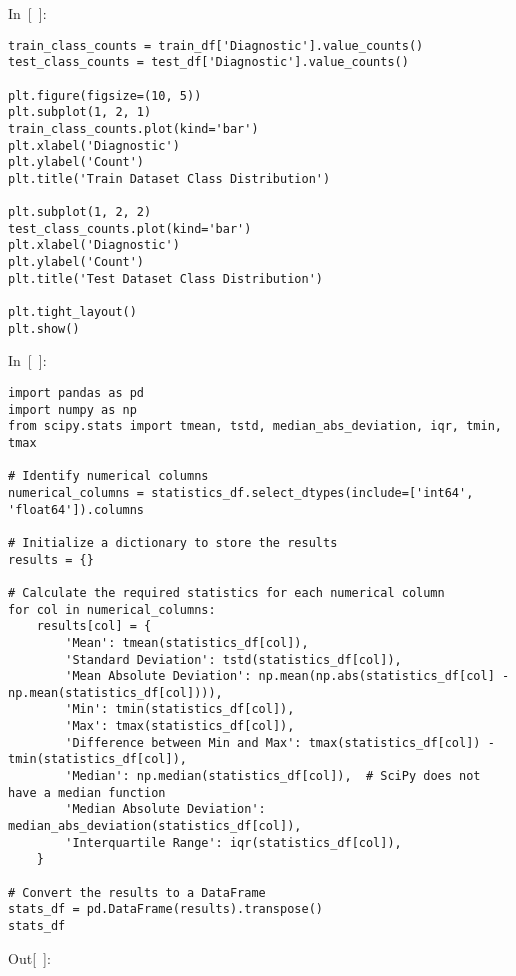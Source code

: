 \documentclass[
  english,
]{article}
\begin{document}
In~{[}~{]}:

\begin{verbatim}
train_class_counts = train_df['Diagnostic'].value_counts()
test_class_counts = test_df['Diagnostic'].value_counts()

plt.figure(figsize=(10, 5))
plt.subplot(1, 2, 1)
train_class_counts.plot(kind='bar')
plt.xlabel('Diagnostic')
plt.ylabel('Count')
plt.title('Train Dataset Class Distribution')

plt.subplot(1, 2, 2)
test_class_counts.plot(kind='bar')
plt.xlabel('Diagnostic')
plt.ylabel('Count')
plt.title('Test Dataset Class Distribution')

plt.tight_layout()
plt.show()
\end{verbatim}

In~{[}~{]}:

\begin{verbatim}
import pandas as pd
import numpy as np
from scipy.stats import tmean, tstd, median_abs_deviation, iqr, tmin, tmax

# Identify numerical columns
numerical_columns = statistics_df.select_dtypes(include=['int64', 'float64']).columns

# Initialize a dictionary to store the results
results = {}

# Calculate the required statistics for each numerical column
for col in numerical_columns:
    results[col] = {
        'Mean': tmean(statistics_df[col]),
        'Standard Deviation': tstd(statistics_df[col]),
        'Mean Absolute Deviation': np.mean(np.abs(statistics_df[col] - np.mean(statistics_df[col]))),
        'Min': tmin(statistics_df[col]),
        'Max': tmax(statistics_df[col]),
        'Difference between Min and Max': tmax(statistics_df[col]) - tmin(statistics_df[col]),
        'Median': np.median(statistics_df[col]),  # SciPy does not have a median function
        'Median Absolute Deviation': median_abs_deviation(statistics_df[col]),
        'Interquartile Range': iqr(statistics_df[col]),
    }

# Convert the results to a DataFrame
stats_df = pd.DataFrame(results).transpose()
stats_df
\end{verbatim}

Out{[}~{]}:
\end{document}
